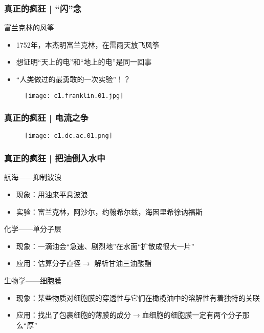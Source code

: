 \begin{frame}
  \frametitle{真正的疯狂 | “闪”念}
  \begin{block}{富兰克林的风筝}
    \begin{itemize}
      \item 1752年，本杰明\textbullet 富兰克林，在雷雨天放飞风筝
      \item 想证明“天上的电”和“地上的电”是同一回事
      \item “人类做过的最勇敢的一次实验”！？
    \end{itemize}
    \vspace{-1.5em}
    \begin{figure}
      \centering
      \texttt{[image: c1.franklin.01.jpg]}
    \end{figure}
  \end{block}
\end{frame}

\begin{frame}
  \frametitle{真正的疯狂 | 电流之争}
  \begin{figure}
    \centering
    \texttt{[image: c1.dc.ac.01.png]}
  \end{figure}
\end{frame}

\begin{frame}
  \frametitle{真正的疯狂 | 把油倒入水中}
  \begin{block}{航海——抑制波浪}
    \begin{itemize}
      \item 现象：用油来平息波浪
      \item 实验：富兰克林，阿沙尔，约翰\textbullet 希尔兹，海因里希\textbullet 徐讷福斯
    \end{itemize}
  \end{block}
  \pause
  \begin{block}{化学——单分子层}
    \begin{itemize}
      \item 现象：一滴油会“急速、剧烈地”在水面“扩散成很大一片”
      \item 应用：估算分子直径$\longrightarrow$ 解析甘油三油酸酯
    \end{itemize}
  \end{block}
  \pause
  \begin{block}{生物学——细胞膜}
    \begin{itemize}
      \item 现象：某些物质对细胞膜的穿透性与它们在橄榄油中的溶解性有着独特的关联
      \item 应用：找出了包裹细胞的薄膜的成分$\longrightarrow$血细胞的细胞膜一定有两个分子那么“厚”
    \end{itemize}
  \end{block}
\end{frame}

